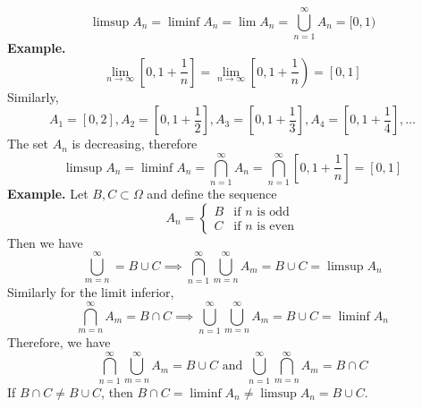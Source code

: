 \[\limsup A_n = \liminf A_n = \lim A_n = \bigcup_{n=1}^\infty A_n = [0,1)\]
\textbf{Example.}
\[\lim_{n\rightarrow\infty} \left[0, 1 + \frac{1}{n}\right] = \lim_{n\rightarrow\infty} \left[0, 1 + \frac{1}{n}\right) = [0,1]\]
Similarly,
\[A_1 = [0,2], A_2 = \left[0,1 + \frac{1}{2}\right], A_3 = \left[0,1 + \frac{1}{3}\right],A_4 = \left[0,1 + \frac{1}{4}\right], \ldots \]
The set $A_n$ is decreasing, therefore
\[\limsup A_n = \liminf A_n =\bigcap_{n=1}^\infty A_n = \bigcap_{n=1}^\infty \left[0, 1 + \frac{1}{n}\right] = [0,1]\]
\noindent
\textbf{Example.} Let $B, C \subset \Omega$ and define the sequence 
\[A_n = \begin{cases}
    B & \text{if } n \text{ is odd}\\
    C & \text{if } n \text{ is even}
\end{cases}\]
Then we have 
\[\bigcup_{m=n}^\infty = B \cup C \implies \bigcap_{n=1}^\infty \bigcup_{m=n}^\infty A_m = B \cup C = \limsup A_n\]
Similarly for the limit inferior, 
\[\bigcap_{m=n}^\infty A_m = B \cap C \implies \bigcup_{n=1}^\infty \bigcup_{m=n}^\infty A_m = B \cup C = \liminf A_n\]
Therefore, we have 
\[\bigcap_{n=1}^\infty \bigcup_{m=n}^\infty A_m = B \cup C \text{ and } \bigcup_{n=1}^\infty \bigcap_{m=n}^\infty A_m = B \cap C\]
If $B \cap C \neq B \cup C$, then $B \cap C = \liminf A_n \neq \limsup A_n = B \cup C$. 
